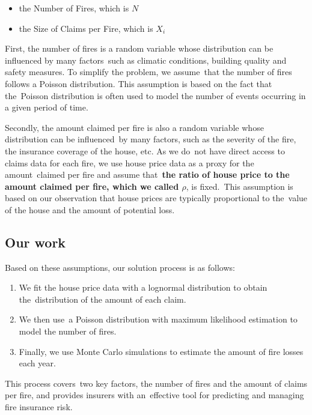 \documentclass[12pt]{article}  %
\begin{document}
\begin{itemize}
    \item the Number of Fires, which is $N$
    \item the Size of Claims per Fire, which is $X_i$
\end{itemize}

First, the number of fires is a random variable whose distribution can be influenced by many factors\ 
such as climatic conditions, building quality and safety measures. To simplify the problem, we assume\ 
that the number of fires follows a Poisson distribution. This assumption is based on the fact that the\ 
Poisson distribution is often used to model the number of events occurring in a given period of time. \textsuperscript{\cite{poisson}}

Secondly, the amount claimed per fire is also a random variable whose distribution can be influenced\ 
by many factors, such as the severity of the fire, the insurance coverage of the house, etc. As we do\
not have direct access to claims data for each fire, we use house price data as a proxy for the amount\
claimed per fire and assume that\
\textbf{the ratio of house price to the amount claimed per fire, which we called  $ \rho $}, is fixed.\
This assumption is based on our observation that house prices are typically proportional to the\
value of the house and the amount of potential loss.

\subsection{Our work}

Based on these assumptions, our solution process is as follows:    

\begin{enumerate}[\bfseries 1.]
    \item We fit the house price data with a lognormal distribution to obtain the\ 
    distribution of the amount of each claim.\textsuperscript{\cite{house1, house2}}
    \item We then use\ 
    a Poisson distribution with maximum likelihood estimation to model the number of fires.
    \item Finally, we use Monte Carlo simulations to estimate the amount of fire losses each year.
\end{enumerate}

This process covers\
two key factors, the number of fires and the amount of claims per fire, and provides insurers with an\ 
effective tool for predicting and managing fire insurance risk.
\end{document}
